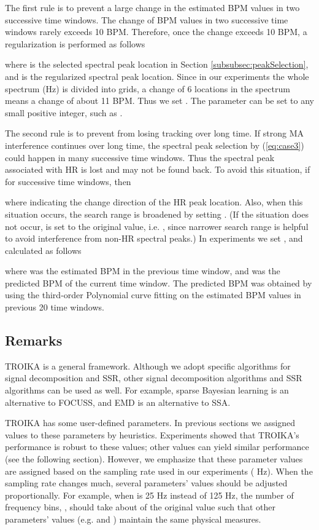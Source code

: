 \documentclass[10pt,twocolumn]{IEEEtran}
\begin{document}
The first  rule is to prevent a large change in the estimated BPM values in two successive time windows. The change of BPM values in two successive time windows rarely exceeds 10 BPM. Therefore, once the change exceeds 10 BPM, a regularization is performed as follows

where  is the selected spectral peak location in Section \ref{subsubsec:peakSelection}, and  is the regularized spectral peak location. Since in our experiments the whole spectrum  (Hz) is divided into  grids, a change of 6 locations in the spectrum means a change of about 11 BPM. Thus we set . The parameter  can be set to any small positive integer, such as .


The second  rule is to prevent from losing tracking over long time. If strong MA interference continues over long time, the spectral peak selection by (\ref{eq:case3}) could happen in many successive time windows. Thus the spectral peak  associated with  HR is  lost and may not be found back. To avoid this situation, if  for  successive time windows, then

where  indicating the change direction of the HR peak location. Also, when this situation occurs,  the search range is broadened by setting . (If the situation does not occur,  is set to the original value, i.e. , since narrower search range is helpful to avoid interference from non-HR spectral peaks.) In  experiments we set , and calculated  as follows

where  was the estimated BPM in the previous time window, and  was the predicted BPM of the current time window. The predicted BPM was obtained by using the third-order Polynomial curve fitting on the estimated BPM values in previous 20 time windows.








\subsection{Remarks}


TROIKA is a general framework. Although we adopt specific algorithms for signal decomposition and SSR, other signal decomposition algorithms and SSR algorithms can be used as well. For example, sparse Bayesian learning \cite{Zhang2013TSP} is an alternative to FOCUSS, and EMD is an alternative to SSA.

TROIKA has some user-defined parameters. In previous sections we assigned values to these parameters by heuristics. Experiments showed that TROIKA's performance is robust to these values; other  values can yield similar performance (see the following section). However, we emphasize that these parameter values are assigned based on the sampling rate used in our experiments ( Hz). When the sampling rate changes much, several parameters' values should be adjusted proportionally. For example, when  is 25 Hz instead of 125 Hz, the number of frequency bins, , should take about  of the original value such that other parameters' values (e.g.  and ) maintain the same physical measures.
\end{document}
